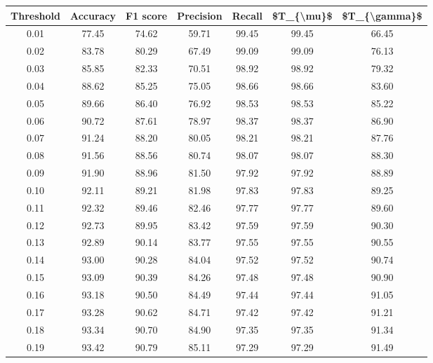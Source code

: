 \begin{tabular}{|c|c|c|c|c|c|c|}
\toprule
 Threshold &  Accuracy &  F1 score &  Precision &  Recall &  \$T\_\{\textbackslash mu\}\$ &  \$T\_\{\textbackslash gamma\}\$ \\
\hline
      0.01 &     77.45 &     74.62 &      59.71 &   99.45 &      99.45 &         66.45 \\
      0.02 &     83.78 &     80.29 &      67.49 &   99.09 &      99.09 &         76.13 \\
      0.03 &     85.85 &     82.33 &      70.51 &   98.92 &      98.92 &         79.32 \\
      0.04 &     88.62 &     85.25 &      75.05 &   98.66 &      98.66 &         83.60 \\
      0.05 &     89.66 &     86.40 &      76.92 &   98.53 &      98.53 &         85.22 \\
      0.06 &     90.72 &     87.61 &      78.97 &   98.37 &      98.37 &         86.90 \\
      0.07 &     91.24 &     88.20 &      80.05 &   98.21 &      98.21 &         87.76 \\
      0.08 &     91.56 &     88.56 &      80.74 &   98.07 &      98.07 &         88.30 \\
      0.09 &     91.90 &     88.96 &      81.50 &   97.92 &      97.92 &         88.89 \\
      0.10 &     92.11 &     89.21 &      81.98 &   97.83 &      97.83 &         89.25 \\
      0.11 &     92.32 &     89.46 &      82.46 &   97.77 &      97.77 &         89.60 \\
      0.12 &     92.73 &     89.95 &      83.42 &   97.59 &      97.59 &         90.30 \\
      0.13 &     92.89 &     90.14 &      83.77 &   97.55 &      97.55 &         90.55 \\
      0.14 &     93.00 &     90.28 &      84.04 &   97.52 &      97.52 &         90.74 \\
      0.15 &     93.09 &     90.39 &      84.26 &   97.48 &      97.48 &         90.90 \\
      0.16 &     93.18 &     90.50 &      84.49 &   97.44 &      97.44 &         91.05 \\
      0.17 &     93.28 &     90.62 &      84.71 &   97.42 &      97.42 &         91.21 \\
      0.18 &     93.34 &     90.70 &      84.90 &   97.35 &      97.35 &         91.34 \\
      0.19 &     93.42 &     90.79 &      85.11 &   97.29 &      97.29 &         91.49 \\

\end{tabular}

